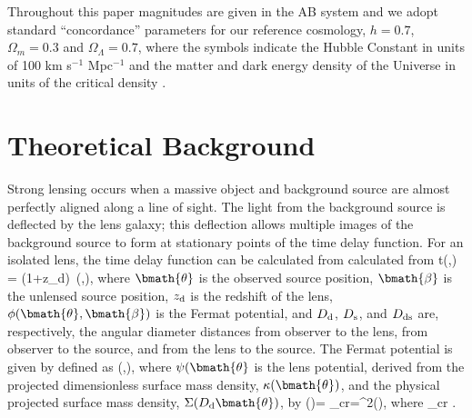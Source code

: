 \documentclass[useAMS,usenatbib]{mn2e}
\begin{document}
Throughout this paper magnitudes are given in the AB system \citep{Oke74} and
we adopt standard ``concordance'' parameters for our reference cosmology, \ie
$h=0.7$, $\Omega_m=0.3$ and $\Omega_\Lambda=0.7$, where the symbols indicate
the Hubble Constant in units of 100 km s$^{-1}$ Mpc$^{-1}$ and the matter and
dark energy density of the Universe in units of the critical density
\citep[e.g.\ ][]{Kom++09}.



\section{Theoretical Background}
\label{sec:theory}


Strong lensing occurs when a massive object and background source are almost perfectly
aligned along a line of sight. The light from the background source is deflected by the
lens galaxy; this deflection allows multiple images of the background source to form
at stationary points of the time delay function. For an isolated lens, the time delay
function can be calculated from calculated from 
\be \label{eq:T} 
\Delta t(\bmath{\theta},\bmath{\beta}) =   (1+z_{\rm d})\, \phi(\bmath{\theta},\bmath{\beta}),
\ee
where $\bmath{\theta}$ is the observed source position, $\bmath{\beta}$ is the 
unlensed source position, $z_{\rm d}$ is the redshift of the lens, $\phi(\bmath{\theta},\bmath{\beta})$ is
the Fermat potential, and $D_{\rm d}$, $D_{\rm s}$, and $D_{\rm ds}$
are, respectively, the angular diameter distances from observer to the lens, from observer
to the source, and from the lens to the source. The Fermat potential is given by
defined as
\be \label{eq:FP}
\phi(\bmath{\theta},\bmath{\beta})\equiv {}, 
\ee
where $\psi(\bmath{\theta}$ is the lens potential, derived from the projected dimensionless
surface mass density, $\kappa(\bmath{\theta})$, and the physical projected surface mass density,
$\Sigma(D_{\rm d} \bmath{\theta})$, by 
\be \label{eq:psikappa}
\kappa(\bmath{\theta})=  {\Sigma_{\rm cr}}=\nabla^2\psi(\bmath{\theta}),
\ee
where 
\be \label{eq:sigcrit} 
\Sigma_{\rm cr} \equiv {}.
\ee
\end{document}
